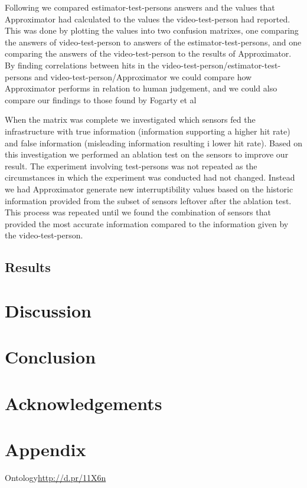 \documentclass{sigchi}
\begin{document}
Following we compared estimator-test-persons answers and the values that Approximator had calculated to the values the video-test-person had reported.
This was done by plotting the values into two confusion matrixes, one comparing the answers of video-test-person to answers of the estimator-test-persons, and one comparing the answers of the video-test-person to the results of Approximator.
By finding correlations between hits in the video-test-person/estimator-test-persons and video-test-person/Approximator we could compare how Approximator performs in relation to human judgement, and we could also compare our findings to those found by Fogarty et al \cite{fogarty2005predicting}

When the matrix was complete we investigated which sensors fed the infrastructure with true information (information supporting a higher hit rate) and false information (misleading information resulting i lower hit rate).
Based on this investigation we performed an ablation test on the sensors to improve our result.
The experiment involving test-persons was not repeated as the circumstances in which the experiment was conducted had not changed.
Instead we had Approximator generate new interruptibility values based on the historic information provided from the subset of sensors leftover after the ablation test.
This process was repeated until we found the combination of sensors that provided the most accurate information compared to the information given by the video-test-person.

\subsection{Results}

\section{Discussion}

\section{Conclusion}

\section{Acknowledgements}

\balance



\section{Appendix}
Ontology\url{http://d.pr/11X6n}
\end{document}
